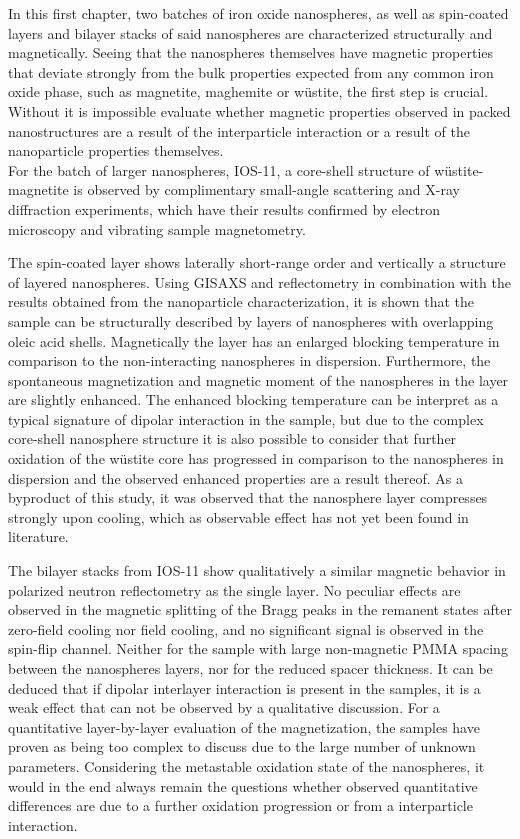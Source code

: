 \documentclass[\main/dresen_thesis.tex]{subfiles}
\begin{document}
  In this first chapter, two batches of iron oxide nanospheres, as well as spin-coated layers and bilayer stacks of said nanospheres are characterized structurally and magnetically.
  Seeing that the nanospheres themselves have magnetic properties that deviate strongly from the bulk properties expected from any common iron oxide phase, such as magnetite, maghemite or w\"ustite, the first step is crucial.
  Without it is impossible evaluate whether magnetic properties observed in packed nanostructures are a result of the interparticle interaction or a result of the nanoparticle properties themselves.
  \\

  For the batch of larger nanospheres, IOS-11, a core-shell structure of w\"ustite-magnetite is observed by complimentary small-angle scattering and X-ray diffraction experiments, which have their results confirmed by electron microscopy and vibrating sample magnetometry.

  The spin-coated layer shows laterally short-range order and vertically a structure of layered nanospheres.
  Using GISAXS and reflectometry in combination with the results obtained from the nanoparticle characterization, it is shown that the sample can be structurally described by layers of nanospheres with overlapping oleic acid shells.
  Magnetically the layer has an enlarged blocking temperature in comparison to the non-interacting nanospheres in dispersion.
  Furthermore, the spontaneous magnetization and magnetic moment of the nanospheres in the layer are slightly enhanced.
  The enhanced blocking temperature can be interpret as a typical signature of dipolar interaction in the sample, but due to the complex core-shell nanosphere structure it is also possible to consider that further oxidation of the w\"ustite core has progressed in comparison to the nanospheres in dispersion and the observed enhanced properties are a result thereof.
  As a byproduct of this study, it was observed that the nanosphere layer compresses strongly upon cooling, which as observable effect has not yet been found in literature.

  The bilayer stacks from IOS-11 show qualitatively a similar magnetic behavior in polarized neutron reflectometry as the single layer.
  No peculiar effects are observed in the magnetic splitting of the Bragg peaks in the remanent states after zero-field cooling nor field cooling, and no significant signal is observed in the spin-flip channel.
  Neither for the sample with large non-magnetic PMMA spacing between the nanospheres layers, nor for the reduced spacer thickness.
  It can be deduced that if dipolar interlayer interaction is present in the samples, it is a weak effect that can not be observed by a qualitative discussion.
  For a quantitative layer-by-layer evaluation of the magnetization, the samples have proven as being too complex to discuss due to the large number of unknown parameters.
  Considering the metastable oxidation state of the nanospheres, it would in the end always remain the questions whether observed quantitative differences are due to a further oxidation progression or from a interparticle interaction.
  \\
\end{document}
